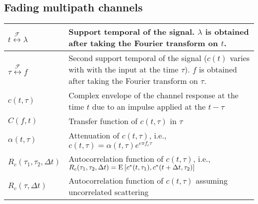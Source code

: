 \documentclass{article}
\begin{document}
\subsection{Fading multipath channels}
\begin{xltabular}{\textwidth}{XX}
	\(t \overset{\mathcal{F}}{\leftrightarrow} \lambda\)                                                                                                    & Support temporal of the signal. \(\lambda\) is obtained after taking the Fourier transform on \(t\).                                                                \\ \hline
	\(\tau \overset{\mathcal{F}}{\leftrightarrow} f\)                                                                                                       & Second support temporal of the signal (\(c(t)\) varies with with the input at the time \(\tau\)). \(f\) is obtained after taking the Fourier transform on \(\tau\). \\ \hline
	\(c(t, \tau)\)                                                                                                                                          & Complex envelope of the channel response at the time \(t\) due to an impulse applied at the \(t - \tau\)                                                            \\ \hline
	\(C(f,t)\)                                                                                                                                              & Transfer function of \(c(t, \tau)\) in \(\tau\)                                                                                                                     \\ \hline
	\(\alpha(t, \tau)\)                                                                                                                                     & Attenuation of \(c(t, \tau)\), i.e., \(c(t, \tau) = \alpha(t, \tau) e^{e\pi f_c \tau}\)                                                                             \\ \hline
	\(R_c(\tau_1, \tau_2, \Delta t)\)                                                                                                                       & Autocorrelation function of \(c(t, \tau)\), i.e., \(R_c(\tau_1, \tau_2, \Delta t) = \E{c^*(t, \tau_1), c^*(t + \Delta t, \tau_2)}\)                                 \\ \hline
	\(R_c(\tau, \Delta t)\)                                                                                                                                 & Autocorrelation function of \(c(t, \tau)\) assuming uncorrelated scattering                                                                                         \\ \hline

\end{xltabular}
\end{document}
